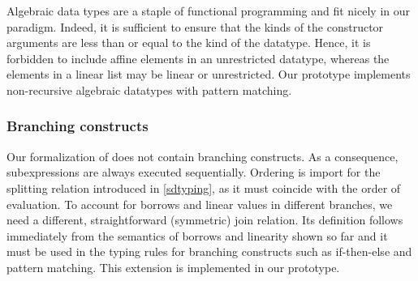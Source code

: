 Algebraic data types are a staple of functional programming and fit nicely
in our paradigm. Indeed, it is sufficient to ensure  that the kinds of
the constructor arguments are less than or equal to the kind of the datatype.
Hence, it is forbidden to include affine elements in an unrestricted
datatype, whereas the elements in a linear list may be linear or
unrestricted.
Our prototype implements non-recursive algebraic datatypes with
pattern matching.

\subsubsection{Branching constructs}

Our formalization of \lang does not contain branching constructs. As a consequence,
subexpressions are always executed sequentially. Ordering is import
for the splitting relation introduced in \cref{sdtyping}, as it must
coincide with the order of evaluation. To account for borrows and linear
values in different branches, we need a different, straightforward (symmetric) join relation.
Its definition follows immediately from the semantics of borrows and linearity
shown so far and it must be used in the typing rules for branching
constructs such as if-then-else and pattern matching.
This extension is implemented in our prototype.

\lstDeleteShortInline@

